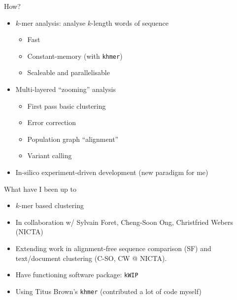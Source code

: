 \documentclass[t]{beamer}
\begin{document}
\begin{frame}{How?}
  \begin{itemize}
    \item $k$-mer analysis: analyse $k$-length words of sequence
    \begin{itemize}
      \item Fast
      \item Constant-memory (with \texttt{khmer})
      \item Scaleable and parallelisable
    \end{itemize}
  \pause
    \item Multi-layered ``zooming'' analysis
      \begin{itemize}
        \item First pass basic clustering
        \item Error correction
        \item Population graph ``alignment''
        \item Variant calling
      \end{itemize}
  \pause
    \item In-silico experiment-driven development (new paradigm for me)
  \end{itemize}
\end{frame}

\begin{frame}{What have I been up to}
  \begin{itemize}
    \item $k$-mer based clustering
  \pause
    \item In collaboration w/ Sylvain Foret, Cheng-Soon Ong, Christfried
      Webers (NICTA)
  \pause
    \item Extending work in alignment-free sequence comparison (SF) and
      text/document clustering (C-SO, CW @ NICTA).
  \pause
    \item Have functioning software package: \texttt{kWIP}
  \pause
    \item Using Titus Brown's \texttt{khmer} (contributed a lot of code myself)
  \end{itemize}
\end{frame}
\end{document}
